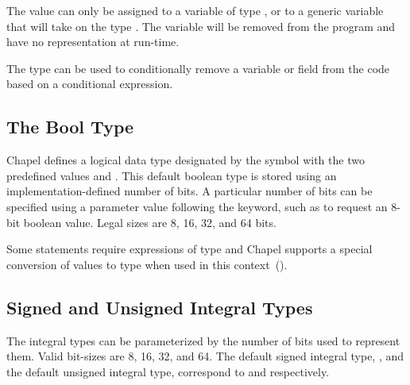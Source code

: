The value  can only be assigned to a variable of type
, or to a generic variable that will take on the type
. The variable will be removed from the program and
have no representation at run-time.

\begin{rationale}
The  type can be used to conditionally remove a variable
or field from the code based on a  conditional expression. 
\end{rationale}

\subsection{The Bool Type}
\label{The_Bool_Type}

Chapel defines a logical data type designated by the symbol
 with the two predefined values  and
.  This default boolean type is stored using an
implementation-defined number of bits.  A particular number of bits
can be specified using a parameter value following the 
keyword, such as  to request an 8-bit boolean value.
Legal sizes are 8, 16, 32, and 64 bits.


Some statements require expressions of  type and Chapel
supports a special conversion of values to  type when used
in this context~().

\subsection{Signed and Unsigned Integral Types}
\label{Signed_and_Unsigned_Integral_Types}

The integral types can be parameterized by the number of bits used to
represent them.  Valid bit-sizes are 8, 16, 32, and 64.  The default signed integral type, , and the
default unsigned integral type,  correspond to 
 and  respectively.

%

